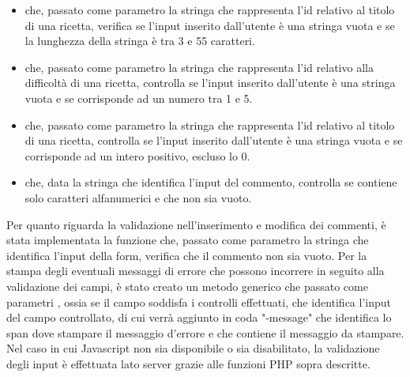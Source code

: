 \begin{itemize}
	\item {} che, passato come parametro la stringa che rappresenta l'id relativo al titolo di una ricetta, verifica se l'input inserito dall'utente è una stringa vuota e se la lunghezza della stringa è tra 3 e 55 caratteri.
	\item {} che, passato come parametro la stringa che rappresenta l'id relativo alla difficoltà di una ricetta, controlla se l'input inserito dall'utente è una stringa vuota e se corrisponde ad un numero tra 1 e 5.
	\item {} che, passato come parametro la stringa che rappresenta l'id relativo al titolo di una ricetta, controlla se l'input inserito dall'utente è una stringa vuota e se corrisponde ad un intero positivo, escluso lo 0.
	\item {} che, data la stringa che identifica l'input del commento, controlla se contiene solo caratteri alfanumerici e che non sia vuoto.
\end{itemize}
Per quanto riguarda la validazione nell'inserimento e modifica dei commenti, è stata implementata la funzione  che, passato come parametro la stringa che identifica l'input della form, verifica che il commento non sia vuoto. \newline
Per la stampa degli eventuali messaggi di errore che possono incorrere in seguito alla validazione dei campi, è stato creato un metodo generico  che passato come parametri , ossia se il campo soddisfa i controlli effettuati,  che identifica l'input del campo controllato, di cui verrà aggiunto in coda "-message" che identifica lo span dove stampare il messaggio d'errore e  che contiene il messaggio da stampare.
Nel caso in cui Javascript non sia disponibile o sia disabilitato, la validazione degli input è effettuata lato server grazie alle funzioni PHP sopra descritte.

